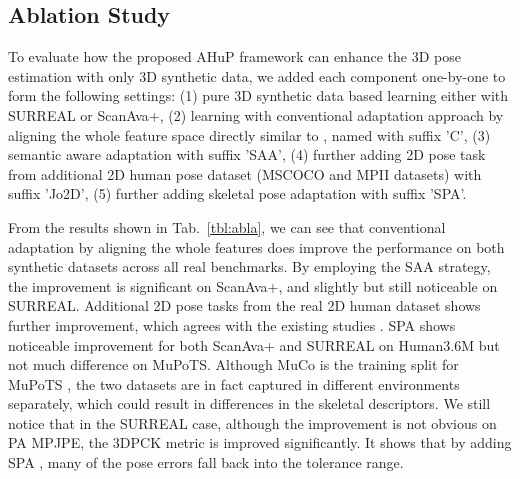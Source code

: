 \documentclass[twocolumn]{svjour3}          \smartqed  \usepackage{graphicx}
\newcommand{\tabref}[1]{Tab.~\ref{#1}}
\begin{document}
\subsection{Ablation Study}
To evaluate how the proposed AHuP framework can enhance the 3D pose estimation with only 3D synthetic data, we added each component one-by-one to form the following settings: (1) pure 3D synthetic data based learning either with SURREAL or ScanAva+, (2) learning with conventional adaptation approach by aligning the whole feature space directly similar to  \cite{chen2016synthesizing,long2015learning,sun2016deep}, named with suffix 'C', (3) semantic aware adaptation with suffix 'SAA', (4) further adding 2D pose task from additional 2D human pose dataset (MSCOCO and MPII datasets) with suffix 'Jo2D', (5) further adding  skeletal pose adaptation with suffix 'SPA'.    



From the results shown in \tabref{tbl:abla}, we can see that conventional adaptation by aligning the whole features \cite{tzeng2017adversarial,tzeng2015simultaneous} does improve the performance on  both synthetic datasets across all real benchmarks.  
By employing the SAA strategy, the improvement is significant on ScanAva+, and  slightly but still noticeable on SURREAL.  
Additional 2D pose tasks from the real 2D human dataset shows further improvement, which agrees with the existing studies \cite{zhou2017towards}. SPA shows noticeable improvement for both ScanAva+ and SURREAL on Human3.6M but not much difference on MuPoTS. Although MuCo is  the training split for MuPoTS  \cite{singleshotmultiperson2018}, the two datasets are in fact captured in different environments separately,
which could result in differences in the skeletal descriptors. 
We still notice that in the SURREAL case, although the improvement is not obvious on PA MPJPE, the 3DPCK metric is improved significantly. 
It shows that by adding SPA , many of the pose errors fall back into the tolerance range.  
\end{document}
